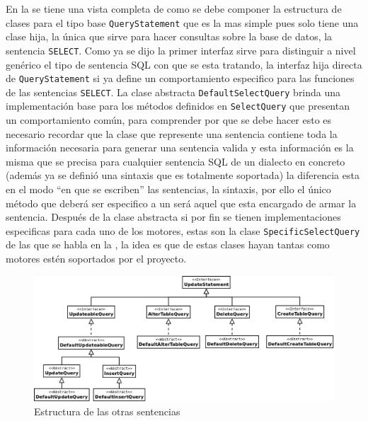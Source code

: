 En la  se tiene una vista completa de como se debe componer la estructura de clases para el tipo base \verb=QueryStatement= que es la mas simple pues solo tiene una clase hija, la única que sirve para hacer consultas sobre la base de datos, la sentencia \verb=SELECT=. Como ya se dijo la primer interfaz sirve para distinguir a nivel genérico el tipo de sentencia SQL con que se esta tratando, la interfaz hija directa de \verb=QueryStatement= si ya define un comportamiento especifico para las funciones de las sentencias \verb=SELECT=. La clase abstracta \verb=DefaultSelectQuery= brinda una implementación base para los métodos definidos en \verb=SelectQuery= que presentan un comportamiento común, para comprender por que se debe hacer esto es necesario recordar que la clase que represente una sentencia contiene toda la información necesaria para generar una sentencia valida y esta información es la misma que se precisa para cualquier sentencia SQL de un dialecto en concreto (además ya se definió una sintaxis que es totalmente soportada) la diferencia esta en el modo ``en que se escriben'' las sentencias, la sintaxis, por ello el único método que deberá ser especifico a un \dd será aquel que esta encargado de armar la sentencia. Después de la clase abstracta si por fin se tienen implementaciones especificas para cada uno de los motores, estas son la clase \verb=SpecificSelectQuery= de las que se habla en la , la idea es que de estas clases hayan tantas como motores estén soportados por el proyecto.
%
\begin{figure}[h]
  \centering
    \includegraphics[width=\textwidth]{figuras/crossdb-update.png}
  \caption{Estructura de las otras sentencias}
  \label{fig:update}
\end{figure}

